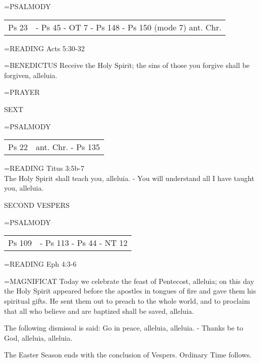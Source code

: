 \hangindent=\parindent \small{PSALMODY}
\begin{center}
\begin{tabular}{ l l }
Ps 23 &  - Ps 45 - OT 7 - Ps 148 - Ps 150 (mode 7) ant. Chr.\\
\end{tabular}
\end{center}		

\hangindent=\parindent \small{\uppercase{READING}}	Acts 5:30-32 \textbf{\\}

\hangindent=\parindent \small{BENEDICTUS 	Receive the Holy Spirit; the sins of those you forgive shall be forgiven, alleluia.\\}

\hangindent=\parindent \small{PRAYER 	}

\begin{flushleft}\normalsize SEXT\\\end{flushleft}
\hangindent=\parindent \small{PSALMODY}
\begin{center}
\begin{tabular}{ l l }
Ps 22 &  ant. Chr. - Ps 135\\
\end{tabular}
\end{center}		

\hangindent=\parindent \small{\uppercase{READING}}	Titus 3:5b-7 \textbf{\\}
The Holy Spirit shall teach you, alleluia.
- You will understand all I have taught you, alleluia.

\begin{flushleft}\normalsize SECOND VESPERS\\\end{flushleft}
\hangindent=\parindent \small{PSALMODY}
\begin{center}
\begin{tabular}{ l l }
Ps 109 &  - Ps 113 - Ps 44 - NT 12\\
\end{tabular}
\end{center}		

\hangindent=\parindent \small{\uppercase{READING}}	Eph 4:3-6 \textbf{\\}

\hangindent=\parindent \small{MAGNIFICAT 	Today we celebrate the feast of Pentecost, alleluia; on this day the Holy Spirit appeared before the apostles in tongues of fire and gave them his spiritual gifts. He sent them out to preach to the whole world, and to proclaim that all who believe and are baptized shall be saved, alleluia.\\}

The following dismissal is said:
Go in peace, alleluia, alleluia.
- Thanks be to God, alleluia, alleluia.

The Easter Season ends with the conclusion of Vespers.
Ordinary Time follows.
